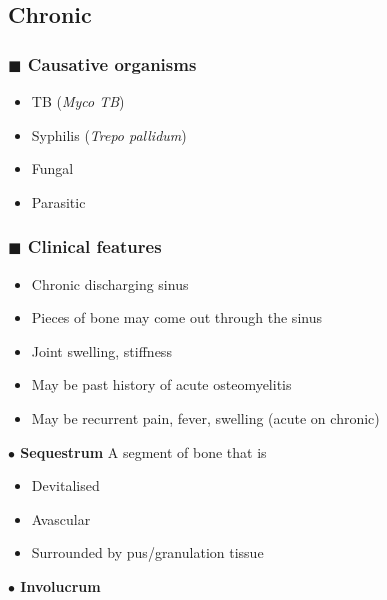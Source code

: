 \documentclass[
  14pt,
]{memoir}
\providecommand{\tightlist}{%
  \setlength{\itemsep}{0pt}\setlength{\parskip}{0pt}}
\begin{document}
\hypertarget{chronic}{%
\subsection{Chronic}\label{chronic}}

\hypertarget{blacksquare-causative-organisms-1}{%
\subsubsection{\texorpdfstring{\(\blacksquare\) Causative
organisms}{\textbackslash blacksquare Causative organisms}}\label{blacksquare-causative-organisms-1}}

\begin{itemize}
\tightlist
\item
  TB (\emph{Myco TB})
\item
  Syphilis (\emph{Trepo pallidum})
\item
  Fungal
\item
  Parasitic
\end{itemize}

\hypertarget{blacksquare-clinical-features-1}{%
\subsubsection{\texorpdfstring{\(\blacksquare\) Clinical
features}{\textbackslash blacksquare Clinical features}}\label{blacksquare-clinical-features-1}}

\begin{itemize}
\tightlist
\item
  Chronic discharging sinus
\item
  Pieces of bone may come out through the sinus
\item
  Joint swelling, stiffness
\item
  May be past history of acute osteomyelitis
\item
  May be recurrent pain, fever, swelling (acute on chronic)
\end{itemize}

\textbf{\(\bullet\) Sequestrum} A segment of bone that is

\begin{itemize}
\tightlist
\item
  Devitalised
\item
  Avascular
\item
  Surrounded by pus/granulation tissue
\end{itemize}

\textbf{\(\bullet\) Involucrum}
\end{document}
